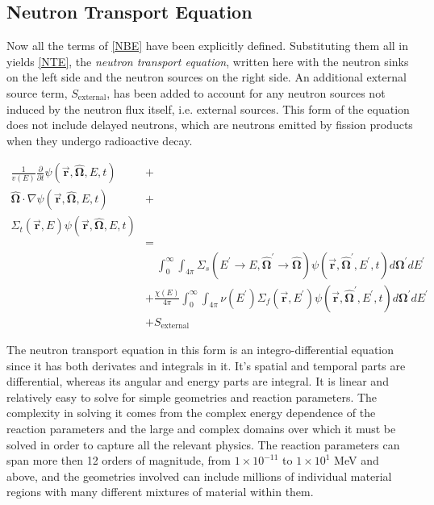 \subsection{Neutron Transport Equation}

Now all the terms of \eqref{NBE} have been explicitly defined.  Substituting them all in yields \eqref{NTE}, the \emph{neutron transport equation}, written here with the neutron sinks on the left side and the neutron sources on the right side.  An additional external source term, $S_{\mathrm{external}}$, has been added to account for any neutron sources not induced by the neutron flux itself, i.e. external sources.  This form of the equation does not include delayed neutrons, which are neutrons emitted by fission products when they undergo radioactive decay.

\begin{equation}
\label{NTE}
\begin{split}
\frac{1}{v(E)} \frac{\partial }{\partial t}\psi(\boldsymbol{\vec{r}},\boldsymbol{\hat{\Omega}},E,t) &+  \\
\boldsymbol{\hat{\Omega}}  \cdot \nabla \psi(\boldsymbol{\vec{r}},\boldsymbol{\hat{\Omega}},E,t) &+ \\
\Sigma_t(\boldsymbol{\vec{r}},E) \psi(\boldsymbol{\vec{r}},\boldsymbol{\hat{\Omega}},E,t) & \\
& =  \\
& \quad \int_0^\infty  \int_{4\pi} \Sigma_s(E^\prime \rightarrow E,\boldsymbol{\hat{\Omega}}^\prime \rightarrow \boldsymbol{\hat{\Omega}}) \psi(\boldsymbol{\vec{r}},\boldsymbol{\hat{\Omega}}^\prime,E^\prime,t) d\boldsymbol{\Omega}^\prime dE^\prime  \\
&+ \frac{\chi(E)}{4\pi} \int_0^\infty  \int_{4\pi}   \nu(E^\prime) \Sigma_f(\boldsymbol{\vec{r}},E^\prime) \psi(\boldsymbol{\vec{r}},\boldsymbol{\hat{\Omega}}^\prime,E^\prime,t) d\boldsymbol{\Omega}^\prime  dE^\prime\\
& + S_{\mathrm{external}}
\end{split}
 \end{equation}
 
 The neutron transport equation in this form is an integro-differential equation since it has both derivates and integrals in it.  It's spatial and temporal parts are differential, whereas its angular and energy parts are integral.  It is linear and relatively easy to solve for simple geometries and reaction parameters.  The complexity in solving it comes from the complex energy dependence of the reaction parameters and the large and complex domains over which it must be solved in order to capture all the relevant physics.  The reaction parameters can span more then 12 orders of magnitude, from $1\times 10 ^{-11}$ to $1\times 10 ^{1}$ MeV and above, and the geometries involved can include millions of individual material regions with many different mixtures of material within them.
 
